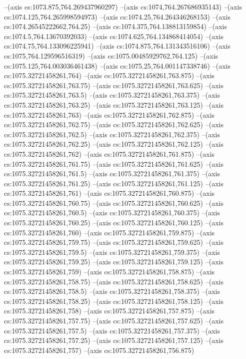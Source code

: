 --(axis cs:1073.875,764.269437960297)
--(axis cs:1074,764.267686935143)
--(axis cs:1074.125,764.265998594973)
--(axis cs:1074.25,764.264346268153)
--(axis cs:1074.26545222662,764.25)
--(axis cs:1074.375,764.138813159854)
--(axis cs:1074.5,764.13670392033)
--(axis cs:1074.625,764.134868414054)
--(axis cs:1074.75,764.133096225941)
--(axis cs:1074.875,764.131343516106)
--(axis cs:1075,764.129596516319)
--(axis cs:1075.00485929762,764.125)
--(axis cs:1075.125,764.003036461438)
--(axis cs:1075.25,764.001147338746)
--(axis cs:1075.32721458261,764)
--(axis cs:1075.32721458261,763.875)
--(axis cs:1075.32721458261,763.75)
--(axis cs:1075.32721458261,763.625)
--(axis cs:1075.32721458261,763.5)
--(axis cs:1075.32721458261,763.375)
--(axis cs:1075.32721458261,763.25)
--(axis cs:1075.32721458261,763.125)
--(axis cs:1075.32721458261,763)
--(axis cs:1075.32721458261,762.875)
--(axis cs:1075.32721458261,762.75)
--(axis cs:1075.32721458261,762.625)
--(axis cs:1075.32721458261,762.5)
--(axis cs:1075.32721458261,762.375)
--(axis cs:1075.32721458261,762.25)
--(axis cs:1075.32721458261,762.125)
--(axis cs:1075.32721458261,762)
--(axis cs:1075.32721458261,761.875)
--(axis cs:1075.32721458261,761.75)
--(axis cs:1075.32721458261,761.625)
--(axis cs:1075.32721458261,761.5)
--(axis cs:1075.32721458261,761.375)
--(axis cs:1075.32721458261,761.25)
--(axis cs:1075.32721458261,761.125)
--(axis cs:1075.32721458261,761)
--(axis cs:1075.32721458261,760.875)
--(axis cs:1075.32721458261,760.75)
--(axis cs:1075.32721458261,760.625)
--(axis cs:1075.32721458261,760.5)
--(axis cs:1075.32721458261,760.375)
--(axis cs:1075.32721458261,760.25)
--(axis cs:1075.32721458261,760.125)
--(axis cs:1075.32721458261,760)
--(axis cs:1075.32721458261,759.875)
--(axis cs:1075.32721458261,759.75)
--(axis cs:1075.32721458261,759.625)
--(axis cs:1075.32721458261,759.5)
--(axis cs:1075.32721458261,759.375)
--(axis cs:1075.32721458261,759.25)
--(axis cs:1075.32721458261,759.125)
--(axis cs:1075.32721458261,759)
--(axis cs:1075.32721458261,758.875)
--(axis cs:1075.32721458261,758.75)
--(axis cs:1075.32721458261,758.625)
--(axis cs:1075.32721458261,758.5)
--(axis cs:1075.32721458261,758.375)
--(axis cs:1075.32721458261,758.25)
--(axis cs:1075.32721458261,758.125)
--(axis cs:1075.32721458261,758)
--(axis cs:1075.32721458261,757.875)
--(axis cs:1075.32721458261,757.75)
--(axis cs:1075.32721458261,757.625)
--(axis cs:1075.32721458261,757.5)
--(axis cs:1075.32721458261,757.375)
--(axis cs:1075.32721458261,757.25)
--(axis cs:1075.32721458261,757.125)
--(axis cs:1075.32721458261,757)
--(axis cs:1075.32721458261,756.875)
